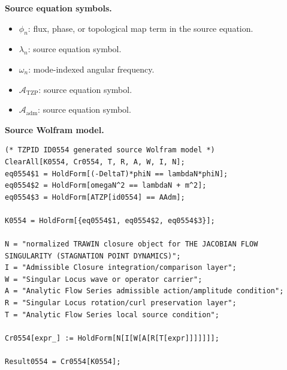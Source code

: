 \begin{minipage}[t]{0.49\linewidth}
\begingroup
\small
\raggedright
\textbf{Source equation symbols.}\par
\begin{itemize}[leftmargin=1.35em,itemsep=1pt,topsep=1pt,parsep=0pt]
    \item $\phi_n$: flux, phase, or topological map term in the source equation.
    \item $\lambda_n$: source equation symbol.
    \item $\omega_n$: mode-indexed angular frequency.
    \item $\mathcal{A}_{\mathrm{TZP}}$: source equation symbol.
    \item $\mathcal{A}_{\mathrm{adm}}$: source equation symbol.
\end{itemize}
\endgroup
\end{minipage}\hfill
\begin{minipage}[t]{0.47\linewidth}
\begingroup
\scriptsize
\raggedright
\textbf{Source Wolfram model.}\par
\begin{Verbatim}[fontsize=\tiny,breaklines=true,breakanywhere=true]
(* TZPID ID0554 generated source Wolfram model *)
ClearAll[K0554, Cr0554, T, R, A, W, I, N];
eq0554$1 = HoldForm[(-DeltaT)*phiN == lambdaN*phiN];
eq0554$2 = HoldForm[omegaN^2 == lambdaN + m^2];
eq0554$3 = HoldForm[ATZP[id0554] == AAdm];

K0554 = HoldForm[{eq0554$1, eq0554$2, eq0554$3}];

N = "normalized TRAWIN closure object for THE JACOBIAN FLOW SINGULARITY (STAGNATION POINT DYNAMICS)";
I = "Admissible Closure integration/comparison layer";
W = "Singular Locus wave or operator carrier";
A = "Analytic Flow Series admissible action/amplitude condition";
R = "Singular Locus rotation/curl preservation layer";
T = "Analytic Flow Series local source condition";

Cr0554[expr_] := HoldForm[N[I[W[A[R[T[expr]]]]]]];

Result0554 = Cr0554[K0554];
\end{Verbatim}
\endgroup
\end{minipage}


